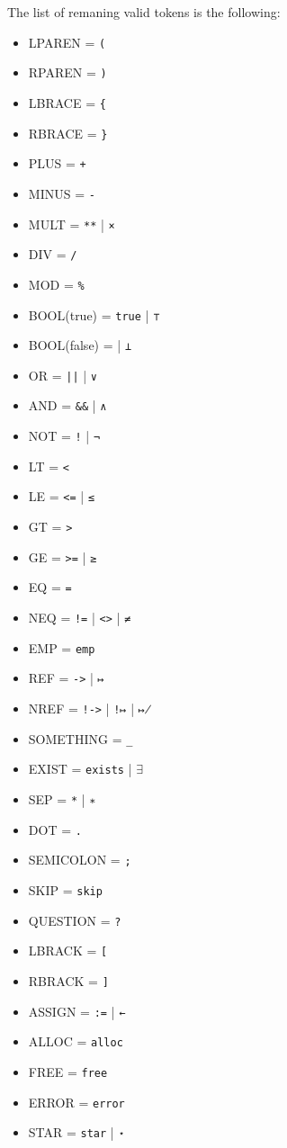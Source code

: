 \documentclass[parskip=half]{scrartcl}
\begin{document}
The list of remaning valid tokens is the following:
\begin{multicols}{3} %
\begin{itemize}
\item LPAREN = \texttt{(}
\item RPAREN = \texttt{)}
\item LBRACE = \texttt{\{}
\item RBRACE = \texttt{\}}
\item PLUS = \texttt{+}
\item MINUS = \texttt{-}
\item MULT = \texttt{**} | \texttt{×}
\item DIV = \texttt{/}
\item MOD = \texttt{\%}
\item BOOL(true) = \texttt{true} | \texttt{⊤}
\item BOOL(false) = \texttt{} | \texttt{⊥}
\item OR = \texttt{||} | \texttt{∨}
\item AND = \texttt{\&\&} | \texttt{∧}
\item NOT = \texttt{!} | \texttt{¬}
\item LT = \texttt{<}
\item LE = \texttt{<=} | \texttt{≤}
\item GT = \texttt{>}
\item GE = \texttt{>=} | \texttt{≥}
\item EQ = \texttt{=}
\item NEQ = \texttt{!=} | \texttt{<>} | \texttt{≠}
\item EMP = \texttt{emp}
\item REF = \texttt{->} | \texttt{↦}
\item NREF = \texttt{!->} | \texttt{!↦} | \texttt{↦̸}
\item SOMETHING = \texttt{\_}
\item EXIST = \texttt{exists} | $\exists$
\item SEP = \texttt{*} | \texttt{∗}
\item DOT = \texttt{.}
\item SEMICOLON = \texttt{;}
\item SKIP = \texttt{skip}
\item QUESTION = \texttt{?}
\item LBRACK = \texttt{[}
\item RBRACK = \texttt{]}
\item ASSIGN = \texttt{:=} | \texttt{←}
\item ALLOC = \texttt{alloc}
\item FREE = \texttt{free}
\item ERROR = \texttt{error}
\item STAR = \texttt{star} | \texttt{⋆}
\end{itemize}
\end{multicols}
\end{document}
